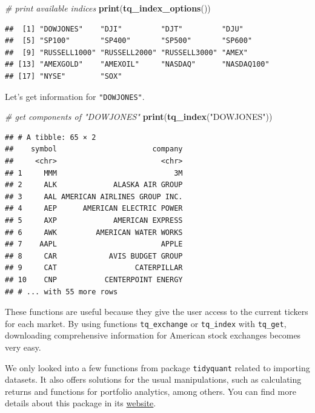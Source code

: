 \documentclass[11pt,]{book}
\newenvironment{Shaded}{\begin{snugshade}}{\end{snugshade}}
\newcommand{\KeywordTok}[1]{\textcolor[rgb]{0.27,0.27,0.27}{\textbf{#1}}}
\newcommand{\StringTok}[1]{\textcolor[rgb]{0.5,0.5,0.5}{#1}}
\newcommand{\CommentTok}[1]{\textcolor[rgb]{0.56,0.35,0.01}{\textit{#1}}}
\newcommand{\NormalTok}[1]{#1}
\begin{document}
\begin{Shaded}
\begin{Highlighting}[]
\CommentTok{# print available indices}
\KeywordTok{print}\NormalTok{(}\KeywordTok{tq_index_options}\NormalTok{())}
\end{Highlighting}
\end{Shaded}

\begin{verbatim}
##  [1] "DOWJONES"    "DJI"         "DJT"         "DJU"        
##  [5] "SP100"       "SP400"       "SP500"       "SP600"      
##  [9] "RUSSELL1000" "RUSSELL2000" "RUSSELL3000" "AMEX"       
## [13] "AMEXGOLD"    "AMEXOIL"     "NASDAQ"      "NASDAQ100"  
## [17] "NYSE"        "SOX"
\end{verbatim}

Let's get information for \texttt{"DOWJONES"}.

\begin{Shaded}
\begin{Highlighting}[]
\CommentTok{# get components of "DOWJONES"}
\KeywordTok{print}\NormalTok{(}\KeywordTok{tq_index}\NormalTok{(}\StringTok{"DOWJONES"}\NormalTok{))}
\end{Highlighting}
\end{Shaded}

\begin{verbatim}
## # A tibble: 65 × 2
##    symbol                      company
##     <chr>                        <chr>
## 1     MMM                           3M
## 2     ALK             ALASKA AIR GROUP
## 3     AAL AMERICAN AIRLINES GROUP INC.
## 4     AEP      AMERICAN ELECTRIC POWER
## 5     AXP             AMERICAN EXPRESS
## 6     AWK         AMERICAN WATER WORKS
## 7    AAPL                        APPLE
## 8     CAR            AVIS BUDGET GROUP
## 9     CAT                  CATERPILLAR
## 10    CNP           CENTERPOINT ENERGY
## # ... with 55 more rows
\end{verbatim}

These functions are useful because they give the user access to the
current tickers for each market. By using functions
\texttt{tq\_exchange} or \texttt{tq\_index} with \texttt{tq\_get},
downloading comprehensive information for American stock exchanges
becomes very easy. 

We only looked into a few functions from package \texttt{tidyquant}
related to importing datasets. It also offers solutions for the usual
manipulations, such as calculating returns and functions for portfolio
analytics, among others. You can find more details about this package in
its \href{http://www.business-science.io/r-packages.html}{website}.
\end{document}
